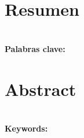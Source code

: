 \begingroup
\chapter{Resumen}
    \lipsum[2-4]

    \textbf{\\\large Palabras clave: }

\chapter{Abstract}
    \lipsum[2-4]
    
    \textbf{\\\large Keywords: }
\endgroup

\tableofcontents